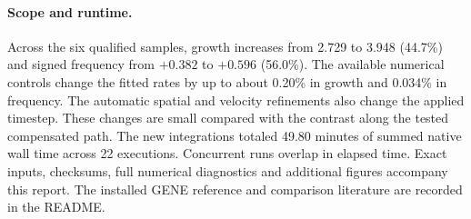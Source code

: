 \paragraph{Scope and runtime.} Across the six qualified samples, growth increases from 2.729 to 3.948 (44.7\%) and signed frequency from $+0.382$ to $+0.596$ (56.0\%). The available numerical controls change the fitted rates by up to about 0.20\% in growth and 0.034\% in frequency. The automatic spatial and velocity refinements also change the applied timestep. These changes are small compared with the contrast along the tested compensated path. The new integrations totaled 49.80 minutes of summed native wall time across 22 executions. Concurrent runs overlap in elapsed time. Exact inputs, checksums, full numerical diagnostics and additional figures accompany this report. The installed GENE reference and comparison literature are recorded in the README.
